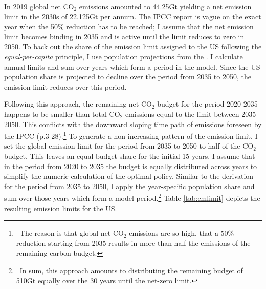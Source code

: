 % 
 In 2019 global net CO$_2$ emissions amounted to 44.25Gt \citep[compare figure SPM1.a p.11 in ][]{IPCCSPM} yielding a net emission limit in the 2030s of 22.125Gt per annum. The IPCC report is vague on the exact year when the 50\% reduction has to be reached; I assume that the net emission limit becomes binding in 2035 and is active until the limit reduces to zero in 2050. 
 To back out the share of the emission limit assigned to the US following the \textit{equal-per-capita} principle, I use population projections from the \cite{UNPOP}. %
 I calculate annual limits and sum over years which form a period in the model.  Since the US population share is projected to decline over the period from 2035 to 2050, the emission limit reduces over this period. 
 
 Following this approach, the remaining net CO$_2$ budget for the period 2020-2035 happens to be smaller than total CO$_2$ emissions equal to the limit between 2035-2050. This conflicts with the downward sloping time path of emissions foreseen by the IPCC (p.3-28).\footnote{\ The reason is that global net-CO$_2$ emissions are so high, that a 50\% reduction starting from 2035 results in more than half the emissions of the remaining carbon budget.}
 To generate a non-increasing pattern of the emission limit, I set the global emission limit for the period from 2035 to 2050 to half of the CO$_2$ budget. This leaves an equal budget share for the initial 15 years. I assume that in the period from 2020 to 2035 the budget is equally distributed across years to simplify the numeric calculation of the optimal policy. Similar to the derivation for the period from 2035 to 2050, I apply the year-specific population share and sum over those years which form a model period.\footnote{\ In sum, this approach amounts to distributing the remaining budget of 510Gt equally over the 30 years until the net-zero limit.} Table \ref{tab:emlimit}  depicts the resulting emission limits for the US.
 
